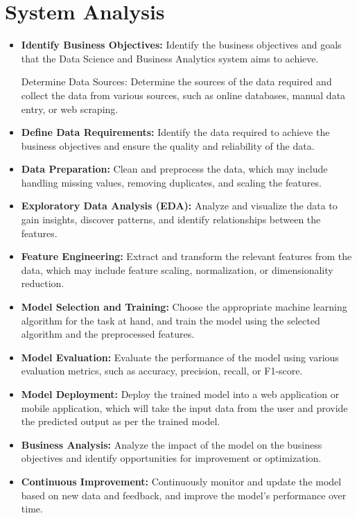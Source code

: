 \section{System Analysis}
\justify
\quad
\begin{itemize}
    \item \textbf{Identify Business Objectives:} Identify the business objectives and goals that the Data Science and Business Analytics system aims to achieve.

{Determine Data Sources:} Determine the sources of the data required and collect the data from various sources, such as online databases, manual data entry, or web scraping.









    \item \textbf{Define Data Requirements:} Identify the data required to achieve the business objectives and ensure the quality and reliability of the data.
    \item \textbf{Data Preparation:} Clean and preprocess the data, which may include handling missing values, removing duplicates, and scaling the features.
    \item \textbf{Exploratory Data Analysis (EDA):} Analyze and visualize the data to gain insights, discover patterns, and identify relationships between the features.
    \item \textbf{Feature Engineering:} Extract and transform the relevant features from the data, which may include feature scaling, normalization, or dimensionality reduction.
    \item \textbf{Model Selection and Training:} Choose the appropriate machine learning algorithm for the task at hand, and train the model using the selected algorithm and the preprocessed features.
    \item \textbf{Model Evaluation:} Evaluate the performance of the model using various evaluation metrics, such as accuracy, precision, recall, or F1-score.
    \item \textbf{Model Deployment:} Deploy the trained model into a web application or mobile application, which will take the input data from the user and provide the predicted output as per the trained model.
    \item \textbf{Business Analysis:} Analyze the impact of the model on the business objectives and identify opportunities for improvement or optimization.
    \item \textbf{Continuous Improvement: }Continuously monitor and update the model based on new data and feedback, and improve the model's performance over time.
\end{itemize}
\newpage

